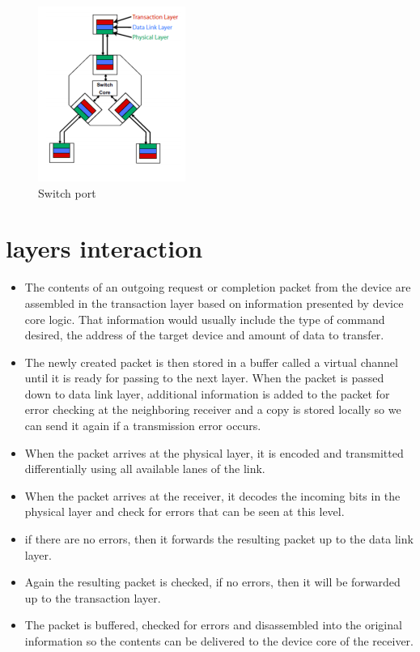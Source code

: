 \begin{itemize}
\begin{figure}[H]
  \centering
  \includegraphics{images/Tl.png}
  \caption{Switch port}
  \label{lane}
\end{figure}
\end{itemize}

\section{layers interaction}
\begin{itemize}
    \item The contents of an outgoing request or completion packet from the device are
assembled in the transaction layer based on information presented by device core
logic. That information would usually include the type of command desired, the
address of the target device and amount of data to transfer.
\item The newly created packet is then stored in a buffer called a virtual channel until it
is ready for passing to the next layer. When the packet is passed down to data link
layer, additional information is added to the packet for error checking at the neighboring receiver and a copy is stored locally so we can send it again if a
transmission error occurs.
\item When the packet arrives at the physical layer, it is encoded and transmitted
differentially using all available lanes of the link.
\item When the packet arrives at the receiver, it decodes the incoming bits in the
physical layer and check for errors that can be seen at this level.
\item if there are no errors, then it forwards the resulting packet up to the data link
layer.
\item Again the resulting packet is checked, if no errors, then it will be forwarded up to
the transaction layer.
\item The packet is buffered, checked for errors and disassembled into the original
information so the contents can be delivered to the device core of the receiver.
\end{itemize}

